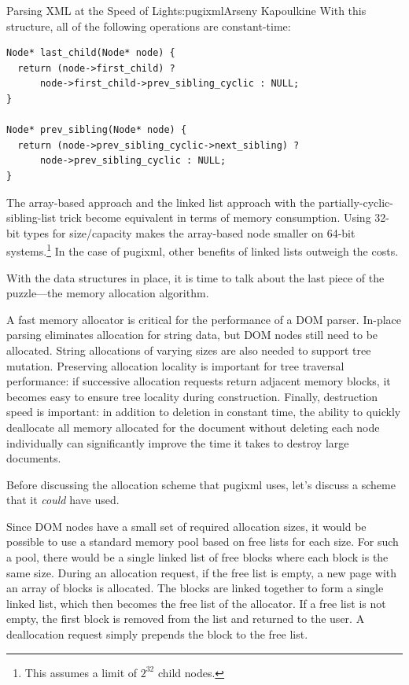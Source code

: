 \begin{aosachapter}{Parsing XML at the Speed of Light}{s:pugixml}{Arseny Kapoulkine}
\noindent With this structure, all of the following operations are
constant-time:

\begin{verbatim}
Node* last_child(Node* node) {
  return (node->first_child) ?
      node->first_child->prev_sibling_cyclic : NULL;
}

Node* prev_sibling(Node* node) {
  return (node->prev_sibling_cyclic->next_sibling) ?
      node->prev_sibling_cyclic : NULL;
}
\end{verbatim}

The array-based approach and the linked list approach with the
partially-cyclic-sibling-list trick become equivalent in terms of memory
consumption. Using 32-bit types for size/capacity makes the array-based
node smaller on 64-bit systems.\footnote{This assumes a limit of $2^{32}$
  child nodes.} In the case of pugixml, other benefits of linked lists
outweigh the costs.

With the data structures in place, it is time to talk about the last
piece of the puzzle---the memory allocation algorithm.


A fast memory allocator is critical for the performance of a DOM parser.
In-place parsing eliminates allocation for string data, but DOM nodes
still need to be allocated. String allocations of varying sizes are also
needed to support tree mutation. Preserving allocation locality is
important for tree traversal performance: if successive allocation
requests return adjacent memory blocks, it becomes easy to ensure tree
locality during construction. Finally, destruction speed is important:
in addition to deletion in constant time, the ability to quickly
deallocate all memory allocated for the document without deleting each
node individually can significantly improve the time it takes to destroy
large documents.

Before discussing the allocation scheme that pugixml uses, let's discuss
a scheme that it \emph{could} have used.

Since DOM nodes have a small set of required allocation sizes, it would
be possible to use a standard memory pool based on free lists for each
size. For such a pool, there would be a single linked list of free
blocks where each block is the same size. During an allocation request,
if the free list is empty, a new page with an array of blocks is
allocated. The blocks are linked together to form a single linked list,
which then becomes the free list of the allocator. If a free list is not
empty, the first block is removed from the list and returned to the
user. A deallocation request simply prepends the block to the free list.


\end{aosachapter}
